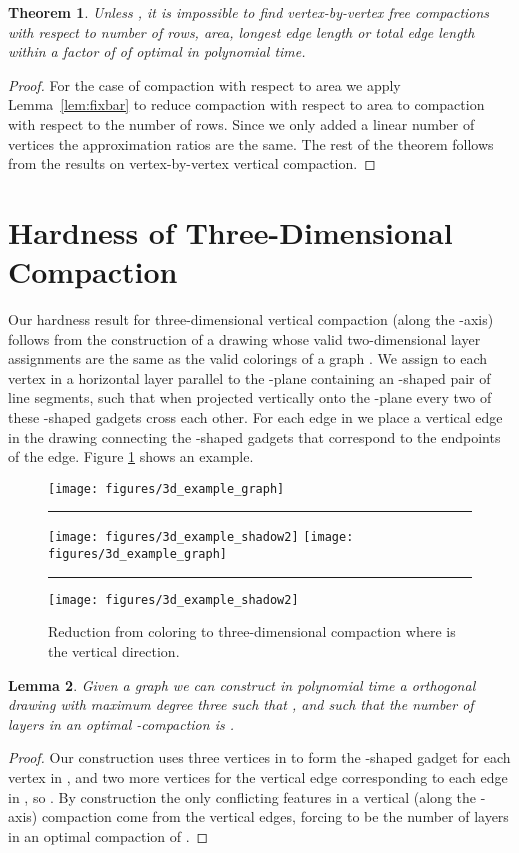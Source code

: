 \documentclass[12pt]{article}
\newtheorem{theorem}{Theorem}
\newtheorem{lemma}[theorem]{Lemma}
\theoremstyle{definitions}
\begin{document}
\begin{theorem}
Unless , it is impossible to find vertex-by-vertex free compactions with respect to number of rows, area, longest edge length or total edge length within a factor of  of optimal in polynomial time.
\end{theorem}
\begin{proof}
For the case of compaction with respect to area we apply Lemma~\ref{lem:fixbar} to reduce compaction with respect to area to compaction with respect to the number of rows. Since we only added a linear number of vertices the approximation ratios are the same. The rest of the theorem follows from the results on vertex-by-vertex vertical compaction.
\end{proof}

\section{Hardness of Three-Dimensional Compaction}
Our hardness result for three-dimensional vertical compaction (along the -axis) follows from the construction of a drawing whose valid two-dimensional layer assignments are the same as the valid colorings of a graph . We assign to each vertex in  a horizontal layer parallel to the -plane containing an -shaped pair of line segments, such that when projected vertically onto the -plane every two of these -shaped gadgets cross each other. For each edge in  we place a vertical edge in the drawing connecting the -shaped gadgets that correspond to the endpoints of the edge. Figure \ref{fig:3dredux} shows an example.
\begin{figure}[b]
\centering
\ifFull
\texttt{[image: figures/3d\_example\_graph]}\rule{4em}{0em}
\texttt{[image: figures/3d\_example\_shadow2]}
\else
\texttt{[image: figures/3d\_example\_graph]}\rule{4em}{0em}
\texttt{[image: figures/3d\_example\_shadow2]}
\fi
\caption{Reduction from coloring to three-dimensional compaction where  is the vertical direction.}
\label{fig:3dredux}
\end{figure}

\begin{lemma}
\label{lem:3dconst}
Given a graph  we can construct in polynomial time a  orthogonal drawing  with maximum degree three such that , and such that the number of layers in an optimal -compaction is .
\end{lemma}

\begin{proof}
Our construction uses three vertices in  to form the -shaped gadget for each vertex in , and two more vertices for the vertical edge corresponding to each edge in , so . By construction the only conflicting features in a vertical (along the -axis) compaction come from the vertical edges, forcing  to be the number of layers in an optimal compaction of .
\end{proof}
\end{document}
